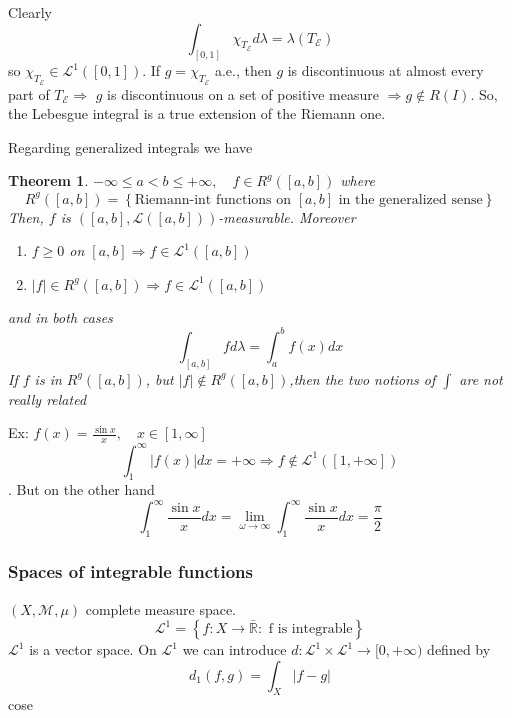 \documentclass[a4paper,12pt]{article}
\theoremstyle{break}
\newtheorem{theorem}{Theorem}[section]
\numberwithin{equation}{section}
\begin{document}
Clearly 
\[
    \int_{[0,1]} \chi_{T_{\mathcal{E}}} d\lambda = \lambda(T_{\mathcal{E}})
\]
so \(\chi_{T_{\mathcal{E}}} \in \mathcal{L}^1([0,1])\).  
If \(g = \chi_{T_{\mathcal{E}}}\) a.e., then \(g\) is discontinuous at almost every part of \(T_{\mathcal{E}} \Longrightarrow\) \(g\) is discontinuous on a set of positive measure \(\Longrightarrow g \not \in R(I)\). 
So, the Lebesgue integral is a true extension of the Riemann one.

Regarding generalized integrals we have
\begin{theorem}
    \(-\infty \leq a < b \leq +\infty, \quad f \in R^g([a,b])\) where 
    \[
        R^g([a,b]) = \left\lbrace \mbox{Riemann-int functions on }[a,b]\mbox{ in the generalized sense} \right\rbrace
    \]
    Then, \(f\) is \(([a,b], \mathcal{L}([a,b]))\)-measurable. Moreover
    \begin{enumerate}
        \item \(f \geq 0\) on \([a,b] \Longrightarrow f \in \mathcal{L}^1([a,b])\)
        \item \(\vert f \vert \in R^g([a,b]) \Longrightarrow f \in \mathcal{L}^1 ([a,b])\)
    \end{enumerate}
    and in both cases
    \[
        \int_{[a,b]} fd\lambda = \int_a^b f(x)dx
    \]
    If \(f\) is in \(R^g([a,b])\), but \(\vert f\vert \not \in R^g([a,b])\),then the two notions of \(\int\) are not really related
\end{theorem}
Ex:
\(f(x) = \frac{\sin x}{x}, \quad x \in [1, \infty]\)
\[\int_1^{\infty} \vert f(x) \vert dx = +\infty \Longrightarrow f \not \in \mathcal{L}^1([1, +\infty])\].
But on the other hand
\[
    \int_1^{\infty} \frac{\sin x}{x} dx = \lim_{\omega \to \infty} \int_1^{\infty} \frac{\sin x}{x} dx = \frac{\pi}{2}
\]
\subsubsection*{Spaces of integrable functions}
\((X, \mathcal{M}, \mu)\) complete measure space.
\[
    \mathcal{L}^1 = \left\lbrace f: X \to \bar{\mathbb{R}} : \mbox{ f is integrable}\right\rbrace
\]
\(\mathcal{L}^1\) is a vector space. On \(\mathcal{L}^1\) we can introduce \(d : \mathcal{L}^1 \times \mathcal{L}^1 \to [0, +\infty)\) defined by 
\[
    d_1 (f,g) =\int_{X} \vert f-g \vert 
\]
cose 
\end{document}
